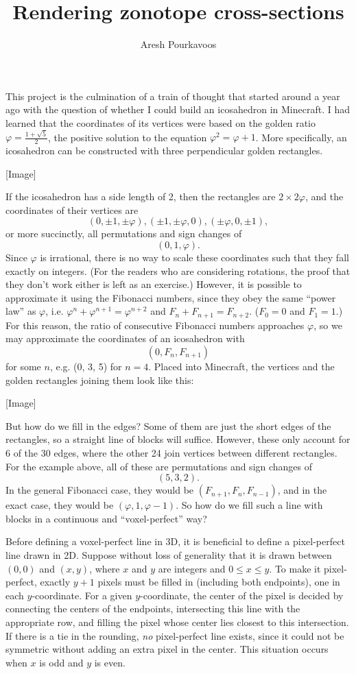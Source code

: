\documentclass{article}
\begin{document}
\title{Rendering zonotope cross-sections}
\author{Aresh Pourkavoos}
\maketitle

This project is the culmination of a train of thought
that started around a year ago
with the question of whether I could build an icosahedron in Minecraft.
I had learned that the coordinates of its vertices
were based on the golden ratio $\varphi = \frac{1+\sqrt{5}}{2}$,
the positive solution to the equation $\varphi^2 = \varphi+1$.
More specifically,
an icosahedron can be constructed with three perpendicular golden rectangles.

[Image]

If the icosahedron has a side length of 2,
then the rectangles are $2 \times 2\varphi$,
and the coordinates of their vertices are
\[
(0, \pm 1, \pm \varphi),
(\pm 1, \pm \varphi, 0),
(\pm \varphi, 0, \pm 1),
\]
or more succinctly,
all permutations and sign changes of
\[(0, 1, \varphi).\]
Since $\varphi$ is irrational,
there is no way to scale these coordinates
such that they fall exactly on integers.
(For the readers who are considering rotations,
the proof that they don't work either is left as an exercise.)
However, it is possible to approximate it using the Fibonacci numbers,
since they obey the same ``power law'' as $\varphi$,
i.e. $\varphi^{n}+\varphi^{n+1}=\varphi^{n+2}$ and $F_n+F_{n+1}=F_{n+2}$.
($F_0=0$ and $F_1=1$.)
For this reason, the ratio of consecutive Fibonacci numbers approaches $\varphi$,
so we may approximate the coordinates of an icosahedron with
\[(0, F_n, F_{n+1})\]
for some $n$,
e.g. (0, 3, 5) for $n=4$.
Placed into Minecraft, the vertices and the golden rectangles joining them look like this:

[Image]

But how do we fill in the edges?
Some of them are just the short edges of the rectangles,
so a straight line of blocks will suffice.
However, these only account for 6 of the 30 edges,
where the other 24 join vertices between different rectangles.
For the example above,
all of these are permutations and sign changes of
\[(5, 3, 2).\]
In the general Fibonacci case,
they would be $(F_{n+1}, F_n, F_{n-1})$,
and in the exact case,
they would be $(\varphi, 1, \varphi-1)$.
So how do we fill such a line with blocks
in a continuous and ``voxel-perfect'' way?

Before defining a voxel-perfect line in 3D,
it is beneficial to define a pixel-perfect line drawn in 2D.
Suppose without loss of generality
that it is drawn between $(0, 0)$ and $(x, y)$,
where $x$ and $y$ are integers and $0 \leq x \leq y$.
To make it pixel-perfect,
exactly $y+1$ pixels must be filled in (including both endpoints),
one in each $y$-coordinate.
For a given $y$-coordinate,
the center of the pixel is decided
by connecting the centers of the endpoints,
intersecting this line with the appropriate row,
and filling the pixel whose center lies closest to this intersection.
If there is a tie in the rounding, \textit{no} pixel-perfect line exists,
since it could not be symmetric without adding an extra pixel in the center.
This situation occurs when $x$ is odd and $y$ is even.
\end{document}
